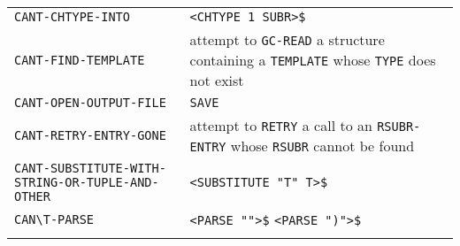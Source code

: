 \documentclass[a4paper,]{article}
\begin{document}
\begin{longtable}[]{@{}ll@{}}
\begin{minipage}[t]{0.58\columnwidth}
\texttt{CANT-CHTYPE-INTO}\strut
\end{minipage} & \begin{minipage}[t]{0.36\columnwidth}\raggedright\strut
\texttt{\textless{}CHTYPE\ 1\ SUBR\textgreater{}\$}\strut
\end{minipage}\tabularnewline
\begin{minipage}[t]{0.58\columnwidth}\raggedright\strut
\texttt{CANT-FIND-TEMPLATE}\strut
\end{minipage} & \begin{minipage}[t]{0.36\columnwidth}\raggedright\strut
attempt to \texttt{GC-READ} a structure containing a \texttt{TEMPLATE} whose \texttt{TYPE} does not exist\strut
\end{minipage}\tabularnewline
\begin{minipage}[t]{0.58\columnwidth}\raggedright\strut
\texttt{CANT-OPEN-OUTPUT-FILE}\strut
\end{minipage} & \begin{minipage}[t]{0.36\columnwidth}\raggedright\strut
\texttt{SAVE}\strut
\end{minipage}\tabularnewline
\begin{minipage}[t]{0.58\columnwidth}\raggedright\strut
\texttt{CANT-RETRY-ENTRY-GONE}\strut
\end{minipage} & \begin{minipage}[t]{0.36\columnwidth}\raggedright\strut
attempt to \texttt{RETRY} a call to an \texttt{RSUBR-ENTRY} whose \texttt{RSUBR} cannot be found\strut
\end{minipage}\tabularnewline
\begin{minipage}[t]{0.58\columnwidth}\raggedright\strut
\texttt{CANT-SUBSTITUTE-WITH-STRING-OR-TUPLE-AND-OTHER}\strut
\end{minipage} & \begin{minipage}[t]{0.36\columnwidth}\raggedright\strut
\texttt{\textless{}SUBSTITUTE\ "T"\ T\textgreater{}\$}\strut
\end{minipage}\tabularnewline
\begin{minipage}[t]{0.58\columnwidth}\raggedright\strut
\texttt{CAN\textbackslash{}\textquotesingle{}T-PARSE}\strut
\end{minipage} & \begin{minipage}[t]{0.36\columnwidth}\raggedright\strut
\texttt{\textless{}PARSE\ ""\textgreater{}\$} \texttt{\textless{}PARSE\ ")"\textgreater{}\$}\strut
\end{minipage}\tabularnewline
\begin{minipage}[t]{0.58\columnwidth}\raggedright\strut

\end{minipage}
\end{longtable}
\end{document}
